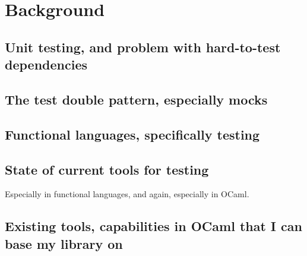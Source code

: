 \chapter{Background}
\label{background}

\section{Unit testing, and problem with hard-to-test dependencies}

\section{The test double pattern, especially mocks}

\section{Functional languages, specifically testing}

\section{State of current tools for testing}

Especially in functional languages, and again, especially in OCaml.

\section{Existing tools, capabilities in OCaml that I can base my library on}

